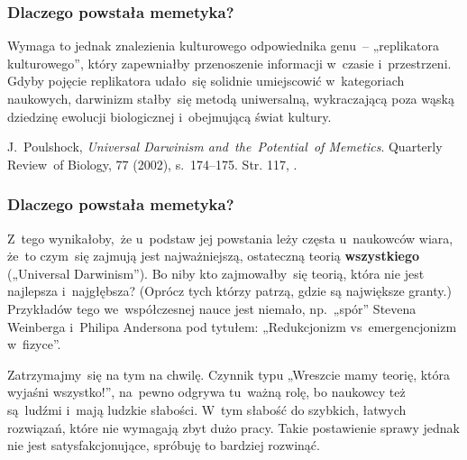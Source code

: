 \documentclass[10pt,t]{beamer}
\begin{document}
\begin{frame}
  \frametitle{Dlaczego powstała memetyka?}


  Wymaga to jednak znalezienia kulturowego odpowiednika
  genu~-- „replikatora kulturowego”, który zapewniałby
  przenoszenie informacji w~czasie i~przestrzeni. Gdyby pojęcie
  replikatora udało~się solidnie umiejscowić w~kategoriach
  naukowych, darwinizm stałby~się metodą uniwersalną, wykraczającą
  poza wąską dziedzinę ewolucji biologicznej i~obejmującą świat
  kultury.

  J.~Poulshock, \textit{Universal Darwinism
    and~the~Potential~of Memetics}. Quarterly Review~of Biology,
  77 (2002), s.~174--175. Str. 117, \cite{McGrathBogDawkinsa2008}.

\end{frame}





\begin{frame}
  \frametitle{Dlaczego powstała memetyka?}


  Z~tego wynikałoby,~że
  u~podstaw jej powstania leży częsta u~naukowców wiara, że~to
  czym~się zajmują jest najważniejszą, ostateczną teorią
  \textbf{wszystkiego} („Universal Darwinism”). Bo niby kto
  zajmowałby~się teorią, która nie jest najlepsza i~najgłębsza?
  (Oprócz tych którzy patrzą, gdzie są największe granty.)
  Przykładów tego we~współczesnej nauce jest niemało,
  np.~„spór” Stevena Weinberga i~Philipa Andersona pod tytułem:
  „Redukcjonizm vs~emergencjonizm w~fizyce”.

  Zatrzymajmy~się na tym na chwilę. Czynnik typu „Wreszcie mamy teorię,
  która wyjaśni wszystko!”,
  na~pewno odgrywa tu~ważną rolę, bo naukowcy też są~ludźmi i~mają
  ludzkie słabości. W~tym słabość do szybkich, łatwych rozwiązań,
  które nie wymagają zbyt dużo pracy. Takie postawienie sprawy
  jednak nie jest satysfakcjonujące, spróbuję to bardziej rozwinąć.

\end{frame}
\end{document}
